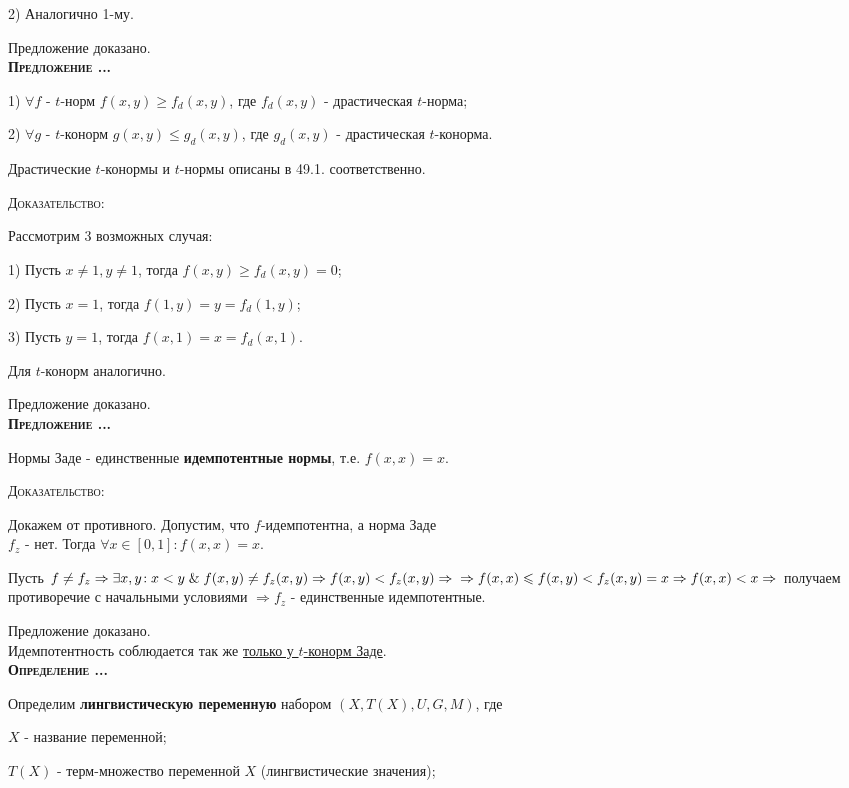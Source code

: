 \documentclass[18pt, a4paper]{extarticle}
\newcounter{par}
\newcounter{spar}
\newcounter{zap}
\newcommand{\opr}{\textbf{\textsc{Определение \thepar.\if\thespar1\thespar.\fi\thezap.\;}}\stepcounter{zap}}
\newcommand{\predl}{\textbf{\textsc{Предложение \thepar.\if\thespar1\thespar.\fi\thezap.\;}}\stepcounter{zap}}
\newcommand{\dok}{\textsc{Доказательство:}}
\newcommand{\ampersand}{\;\&\;}
\begin{document}
2) Аналогично 1-му.

Предложение доказано.\\

\predl


1) $\forall f$ - $t$-норм $f(x,y)\geqslant f_d(x,y)$, где $f_d(x,y)$ - драстическая $t$-норма;

2) $\forall g$ - $t$-конорм $g(x,y)\leqslant g_d(x,y)$, где $g_d(x,y)$ - драстическая $t$-конорма.

Драстические $t$-конормы и $t$-нормы описаны в 49.1. соответственно.

\newpage

\dok

Рассмотрим 3 возможных случая:

1) Пусть $x\neq 1,y\neq1$, тогда $f(x,y)\geqslant f_d(x,y)=0$;

2) Пусть $x=1$, тогда $f(1,y)=y=f_d(1,y)$;

3) Пусть $y=1$, тогда $f(x,1)=x=f_d(x,1)$.

Для $t$-конорм аналогично.

Предложение доказано.\\

\predl

Нормы Заде - единственные \textbf{идемпотентные нормы}, т.е. $f(x,x)=x$.  

\dok

Докажем от противного. Допустим, что $f$-идемпотентна, а норма Заде\\$f_z$ - нет. Тогда $\forall x\in[0,1]\!:f(x,x)=x$.

Пусть $f\neq f_z\Rightarrow\exists x,y\!: x<y\ampersand f(x,y)\neq f_z(x,y)\Rightarrow f(x,y)<f_z(x,y)\Rightarrow\newline\Rightarrow f(x,x)\leqslant f(x,y)<f_z(x,y)=x\Rightarrow f(x,x)<x\Rightarrow$ получаем противоречие с начальными условиями $\Rightarrow f_z$ - единственные идемпотентные.

Предложение доказано.\\

Идемпотентность соблюдается так же \underline{только у $t$-конорм Заде}.\\

\opr

Определим \textbf{лингвистическую переменную} набором $(X, T(X), U, G, M)$, где

$X$ - название переменной;

$T(X)$ - терм-множество переменной $X$ (лингвистические значения);
\end{document}
